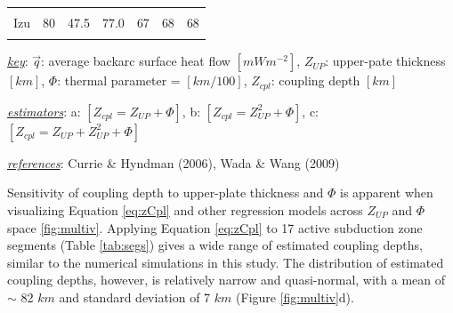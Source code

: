 \begin{table}
\begin{threeparttable}
\begin{tabular}[t]{lrrrrrr}
\cellcolor{gray!6}{Kamchatka} & \cellcolor{gray!6}{70} & \cellcolor{gray!6}{80.2} & \cellcolor{gray!6}{77.0} & \cellcolor{gray!6}{89} & \cellcolor{gray!6}{88} & \cellcolor{gray!6}{88}\\
\addlinespace
Izu & 80 & 47.5 & 77.0 & 67 & 68 & 68\\
\cellcolor{gray!6}{NE Japan} & \cellcolor{gray!6}{88} & \cellcolor{gray!6}{47.7} & \cellcolor{gray!6}{107.9} & \cellcolor{gray!6}{64} & \cellcolor{gray!6}{65} & \cellcolor{gray!6}{65}\\
\bottomrule
\end{tabular}
\begin{tablenotes}
\item \uline{\textit{key}}: $\vec{q}$: average backarc surface heat flow $[mWm^{-2}]$, $Z_{UP}$: upper-pate thickness $[km]$, $\Phi$: thermal parameter = $[km/100]$, $Z_{cpl}$: coupling depth $[km]$
\item \uline{\textit{estimators}}: a: $[Z_{cpl}=Z_{UP}+\Phi]$, b: $[Z_{cpl}=Z_{UP}^2+\Phi]$, c: $[Z_{cpl}=Z_{UP}+Z_{UP}^2+\Phi]$
\item \uline{\textit{references}}: Currie \& Hyndman (2006), Wada \& Wang (2009)
\end{tablenotes}
\end{threeparttable}
\end{table}

Sensitivity of coupling depth to upper-plate thickness and \(\Phi\) is apparent when visualizing Equation \eqref{eq:zCpl} and other regression models across \(Z_{UP}\) and \(\Phi\) space \ref{fig:multiv}. Applying Equation \eqref{eq:zCpl} to 17 active subduction zone segments (Table \ref{tab:segs}) gives a wide range of estimated coupling depths, similar to the numerical simulations in this study. The distribution of estimated coupling depths, however, is relatively narrow and quasi-normal, with a mean of \(\sim\) 82 \(km\) and standard deviation of 7 \(km\) (Figure \ref{fig:multiv}d).

